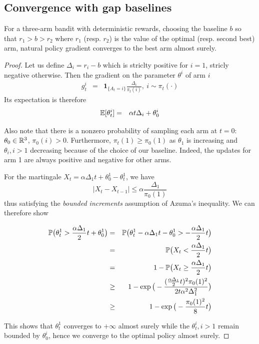 \subsection{Convergence with gap baselines}
\label{app:3arm_gap_baseline}
\begin{proposition}
For a three-arm bandit with deterministic rewards, choosing the baseline $b$ so that $r_1 > b > r_2$ where $r_1$ (resp. $r_2$) is the value of the optimal (resp. second best) arm, natural policy gradient converges to the best arm almost surely.
\end{proposition}
\begin{proof}

Let us define $\Delta_i = r_i-b$ which is striclty positive for $i=1$, stricly negative otherwise. Then the gradient on the parameter $\theta^i$ of arm $i$
\begin{eqnarray*}
g^i_t &=& \bm{1}_{\{A_t = i\}} \frac{\Delta_i}{\pi_t(i)}, \ i \sim \pi_t(\cdot)
\end{eqnarray*}
Its expectation is therefore
\begin{eqnarray*}
\mathbb{E}[\theta^i_t] &=& \alpha t \Delta_i  + \theta^i_0\\
\end{eqnarray*}

Also note that there is a nonzero probability of sampling each arm at $t=0$: $\theta_0 \in \mathbb{R}^3$, $\pi_0(i) > 0$.
Furthermore, $\pi_t(1) \ge \pi_0(1)$ as $\theta_1$ is increasing and $\theta_i, i>1$ decreasing because of the choice of our baseline. Indeed, the updates for arm 1 are always positive and negative for other arms.

For the martingale $X_t = \alpha \Delta_1  t + \theta^1_0 - \theta^1_t  $, we have
$$|X_t - X_{t-1}| \le \alpha \frac{\Delta_1}{\pi_0(1)}$$
thus satisfying the \textit{bounded increments} assumption of Azuma's inequality.
We can therefore show

\begin{eqnarray*}
{\mathbb{P}}\big(\theta^1_t > \frac{\alpha \Delta_1}{2} t   + \theta^1_0\big) &=& {\mathbb{P}}\big(\theta^1_t - \alpha \Delta_1 t  - \theta^1_0> - \frac{\alpha \Delta_1}{2} t \big) \\
&=& {\mathbb{P}}\big(X_t < \frac{\alpha \Delta_1}{2} t \big) \\
&=& 1- {\mathbb{P}}\big(X_t \ge \frac{\alpha \Delta_1}{2} t \big) \\
&\ge& 1-\exp\big(-\frac{(\frac{\alpha \Delta_1}{2} t)^2 \pi_0(1)^2}{2 t \alpha^2 \Delta_1^2 }\big)\\
&\ge& 1-\exp\big(-\frac{\pi_0(1)^2}{8} t\big)
\end{eqnarray*}


This shows that $\theta^1_t$ converges to $+\infty$ almost surely while the $\theta^i_t, i>1$ remain bounded by $\theta^i_0$, hence we converge to the optimal policy almost surely.

\end{proof}


